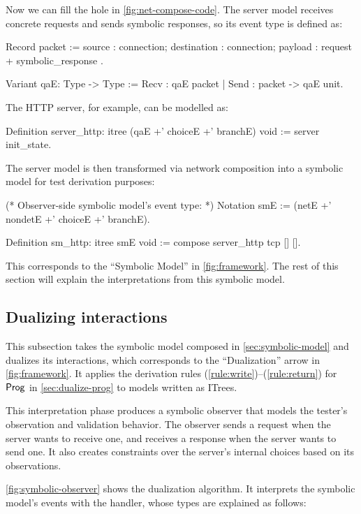 Now we can fill the hole  in \autoref{fig:net-compose-code}.  The
server model receives concrete requests and sends symbolic responses, so its
event type is defined as:
\begin{coq}
  Record packet := {
    source      : connection;
    destination : connection;
    payload     : request + symbolic_response
  }.

  Variant qaE: Type -> Type :=
    Recv : qaE packet
  | Send : packet -> qaE unit.
\end{coq}

The HTTP server, for example, can be modelled as:
\begin{coq}
  Definition server_http: itree (qaE +' choiceE +' branchE) void :=
    server init_state.
\end{coq}

The server model is then transformed via network composition into a symbolic
model for test derivation purposes:
\begin{coq}
  (* Observer-side symbolic model's event type: *)
  Notation smE := (netE +' nondetE +' choiceE +' branchE).
  
  Definition sm_http: itree smE void :=
    compose server_http tcp [] [].
\end{coq}

This corresponds to the ``Symbolic Model'' in \autoref{fig:framework}.  The rest
of this section will explain the interpretations from this symbolic model.

\subsection{Dualizing interactions}
\label{sec:dualize-interaction}
This subsection takes the symbolic model composed in
\autoref{sec:symbolic-model} and dualizes its interactions, which corresponds to
the ``Dualization'' arrow in \autoref{fig:framework}.  It applies the derivation
rules (\ref{rule:write})--(\ref{rule:return}) for $\mathsf{Prog}$ in
\autoref{sec:dualize-prog} to models written as ITrees.

This interpretation phase produces a symbolic observer that models the tester's
observation and validation behavior.  The observer sends a request when the
server wants to receive one, and receives a response when the server wants to
send one.  It also creates constraints over the server's internal choices based
on its observations.

\autoref{fig:symbolic-observer} shows the dualization algorithm.  It interprets
the symbolic model's events with the  handler, whose types are
explained as follows:

